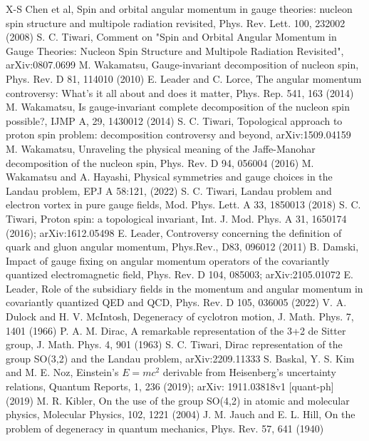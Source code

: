 \documentclass[aps, singlecolumn, showpacs]{revtex4-2}
\begin{document}
\begin{thebibliography}{99}
 X-S Chen et al, Spin and orbital angular momentum in gauge theories: nucleon spin structure and multipole radiation revisited, Phys. Rev. Lett. 100, 232002 (2008)
 S. C. Tiwari, Comment on "Spin and Orbital Angular Momentum in Gauge Theories: Nucleon Spin Structure and Multipole Radiation Revisited", arXiv:0807.0699
 M. Wakamatsu, Gauge-invariant decomposition of nucleon spin, Phys. Rev. D 81, 114010 (2010)
 E. Leader and C. Lorce, The angular momentum controversy: What's it all about and does it matter, Phys. Rep. 541, 163 (2014)
 M. Wakamatsu, Is gauge-invariant complete decomposition of the nucleon spin possible?,  IJMP A, 29, 1430012 (2014)
 S. C. Tiwari, Topological approach to proton spin problem: decomposition controversy and beyond, arXiv:1509.04159
 M. Wakamatsu, Unraveling the physical meaning of the Jaffe-Manohar decomposition of the nucleon spin, Phys. Rev. D 94,  056004 (2016)
 M. Wakamatsu and A. Hayashi, Physical symmetries and gauge choices in the Landau problem, EPJ A 58:121, (2022)
 S. C. Tiwari, Landau problem and electron vortex in pure gauge fields,  Mod. Phys. Lett. A 33, 1850013 (2018)
 S. C. Tiwari, Proton spin: a topological invariant, Int. J. Mod. Phys. A 31, 1650174 (2016); arXiv:1612.05498
 E. Leader, Controversy concerning the definition of quark and gluon angular momentum, Phys.Rev., D83, 096012 (2011)
 B. Damski, Impact of gauge fixing on angular momentum operators of the covariantly quantized electromagnetic field, Phys. Rev. D 104, 085003; arXiv:2105.01072
 E. Leader, Role of the subsidiary fields in the momentum and angular momentum in covariantly quantized QED and QCD, Phys. Rev. D 105, 036005 (2022)
 V. A. Dulock and H. V. McIntosh, Degeneracy of cyclotron motion, J. Math. Phys. 7, 1401 (1966)
 P. A. M. Dirac, A remarkable representation of the 3+2 de Sitter group, J. Math. Phys. 4, 901 (1963)
 S. C. Tiwari, Dirac representation of the group SO(3,2)  and the Landau problem, arXiv:2209.11333
 S. Baskal, Y. S. Kim and M. E. Noz, Einstein's $E=mc^2$ derivable from Heisenberg's uncertainty relations, Quantum Reports, 1, 236 (2019); arXiv: 1911.03818v1 [quant-ph] (2019)
 M. R. Kibler, On the use of the group SO(4,2) in atomic and molecular physics, Molecular Physics, 102, 1221 (2004)
 J. M. Jauch and E. L. Hill, On the problem of degeneracy in quantum mechanics, Phys. Rev. 57, 641 (1940)

\end{thebibliography}
\end{document}
